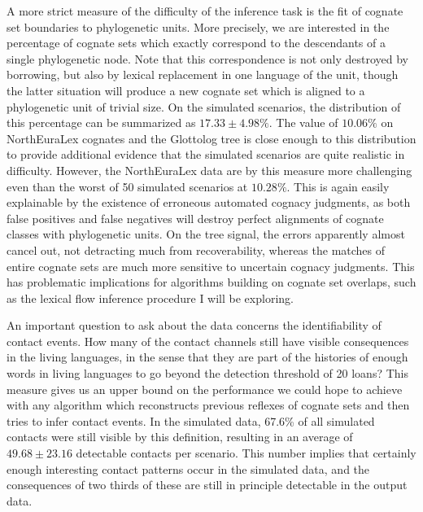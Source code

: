 A more strict measure of the difficulty of the inference task is the fit of cognate set boundaries to phylogenetic units. More precisely, we are interested in the percentage of cognate sets which exactly correspond to the descendants of a single phylogenetic node. Note that this correspondence is not only destroyed by borrowing, but also by lexical replacement in one language of the unit, though the latter situation will produce a new cognate set which is aligned to a phylogenetic unit of trivial size. On the simulated scenarios, the distribution of this percentage can be summarized as $17.33 \pm 4.98\%$. The value of $10.06\%$ on NorthEuraLex cognates and the Glottolog tree is close enough to this distribution to provide additional evidence that the simulated scenarios are quite realistic in difficulty. However, the NorthEuraLex data are by this measure more challenging even than the worst of 50 simulated scenarios at $10.28\%$. This is again easily explainable by the existence of erroneous automated 
cognacy judgments, as both false positives and false negatives will destroy perfect alignments of cognate classes with phylogenetic units. On the tree signal, the errors apparently almost cancel out, not detracting much from recoverability, whereas the matches of entire cognate sets are much more sensitive to uncertain cognacy judgments. This has problematic implications for algorithms building on cognate set overlaps, such as the lexical flow inference procedure I will be exploring.

An important question to ask about the data concerns the identifiability of contact events. How many of the contact channels still have visible consequences in the living languages, in the sense that they are part of the histories of enough words in living languages to go beyond the detection threshold of 20 loans? This measure gives us an upper bound on the performance we could hope to achieve with any algorithm which reconstructs previous reflexes of cognate sets and then tries to infer contact events. In the simulated data, 67.6\% of all simulated contacts were still visible by this definition, resulting in an average of $49.68 \pm 23.16$ detectable contacts per scenario. This number implies that certainly enough interesting contact patterns occur in the simulated data, and the consequences of two thirds of these are still in principle detectable in the output data.

